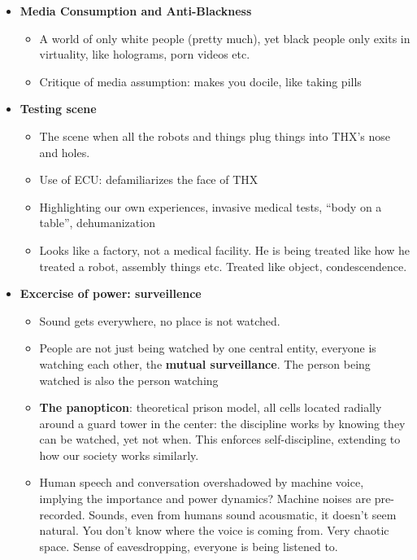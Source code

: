\documentclass[11pt,fleqn]{book}
\begin{document}
\begin{itemize}
{that what Weber calls "rationalization" realizes not
rationality as such but rather, in the name of
rationality, a specific form of unacknowledged
political domination}
    \item \textbf{Media Consumption and Anti-Blackness}
    \begin{itemize}
        \item A world of only white people (pretty much), yet black people only exits in virtuality, like holograms, porn videos etc.
        \item Critique of media assumption: makes you docile, like taking pills
    \end{itemize}
    \item \textbf{Testing scene}
    \begin{itemize}
        \item The scene when all the robots and things plug things into THX's nose and holes.
        \item Use of ECU: defamiliarizes the face of THX
        \item Highlighting our own experiences, invasive medical tests, \enquote{body on a table}, dehumanization
        \item Looks like a factory, not a medical facility. He is being treated like how he treated a robot, assembly things etc. Treated like object, condescendence.
    \end{itemize}
    \item \textbf{Excercise of power: surveillence}
    \begin{itemize}
        \item Sound gets everywhere, no place is not watched. 
        \item People are not just being watched by one central entity, everyone is watching each other, the \textbf{mutual surveillance}. The person being watched is also the person watching
        \item \textbf{The panopticon}: theoretical prison model, all cells located radially around a guard tower in the center: the discipline works by knowing they can be watched, yet not when. This enforces self-discipline, extending to how our society works similarly.
        \item Human speech and conversation overshadowed by machine voice, implying the importance and power dynamics? Machine noises are pre-recorded. Sounds, even from humans sound acousmatic, it doesn't seem natural. You don't know where the voice is coming from. Very chaotic space. Sense of eavesdropping, everyone is being listened to.

\end{itemize}
\end{itemize}
\end{document}
